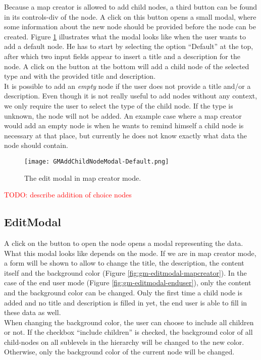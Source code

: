 Because a map creator is allowed to add child nodes, a third button can be found in its controls-div of the node. A click on this button opens a small modal, where some information about the new node should be provided before the node can be created. Figure \ref{fig:gm-add-default} illustrates what the modal looks like when the user wants to add a default node. He has to start by selecting the option ``Default'' at the top, after which two input fields appear to insert a title and a description for the node. A click on the button at the bottom will add a child node of the selected type and with the provided title and description.\\

It is possible to add an \textit{empty} node if the user does not provide a title and/or a description. Even though it is not really useful to add nodes without any context, we only require the user to select the type of the child node. If the type is unknown, the node will not be added. An example case where a map creator would add an empty node is when he wants to remind himself a child node is necessary at that place, but currently he does not know exactly what data the node should contain.

\begin{figure}[H]
	\centering
	\texttt{[image: GMAddChildNodeModal-Default.png]}
	\caption{The edit modal in map creator mode.}
	\label{fig:gm-add-default}
\end{figure}

\textcolor{red}{TODO: describe addition of choice nodes}



\subsection{EditModal}\label{sec:editmodal}
A click on the button to open the node opens a modal representing the data. What this modal looks like depends on the mode. If we are in map creator mode, a form will be shown to allow to change the title, the description, the content itself and the background color (Figure \ref{fig:gm-editmodal-mapcreator}). In the case of the end user mode (Figure \ref{fig:gm-editmodal-enduser}), only the content and the background color can be changed. Only the first time a child node is added and no title and description is filled in yet, the end user is able to fill in these data as well.\\

When changing the background color, the user can choose to include all children or not. If the checkbox ``include children'' is checked, the background color of all child-nodes on all sublevels in the hierarchy will be changed to the new color. Otherwise, only the background color of the current node will be changed.\\


